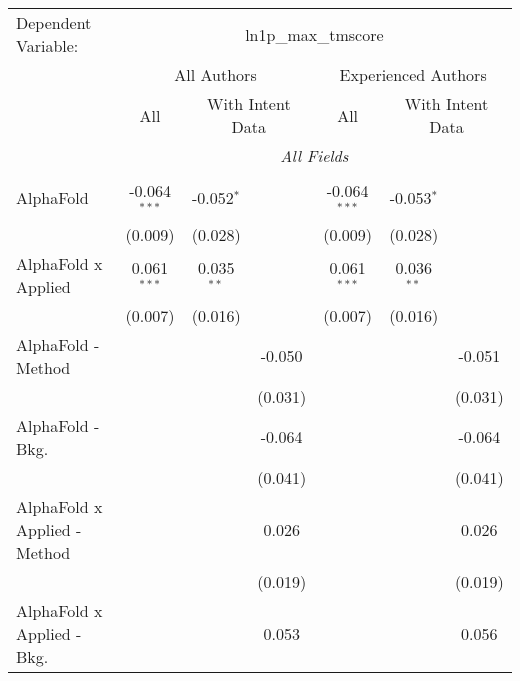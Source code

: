 \begingroup
\centering
\begin{tabular}{lcccccc}
   \tabularnewline \midrule \midrule
   Dependent Variable: & \multicolumn{6}{c}{ln1p\_max\_tmscore}\\
 & \multicolumn{3}{c}{All Authors} & \multicolumn{3}{c}{Experienced Authors} \\
\cmidrule(lr){2-4} \cmidrule(lr){5-7}
 & \multicolumn{1}{c}{All} & \multicolumn{2}{c}{With Intent Data} & \multicolumn{1}{c}{All} & \multicolumn{2}{c}{With Intent Data} \\
\cmidrule(lr){2-2} \cmidrule(lr){3-4} \cmidrule(lr){5-5} \cmidrule(lr){6-7}
 & \multicolumn{6}{c}{\textit{All Fields}} \\ \\
   AlphaFold                      & -0.064$^{***}$ & -0.052$^{*}$ &                & -0.064$^{***}$ & -0.053$^{*}$ &   \\   
                                  & (0.009)        & (0.028)      &                & (0.009)        & (0.028)      &   \\   
   AlphaFold x Applied            & 0.061$^{***}$  & 0.035$^{**}$ &                & 0.061$^{***}$  & 0.036$^{**}$ &   \\   
                                  & (0.007)        & (0.016)      &                & (0.007)        & (0.016)      &   \\   
   AlphaFold - Method             &                &              & -0.050         &                &              & -0.051\\   
                                  &                &              & (0.031)        &                &              & (0.031)\\   
   AlphaFold - Bkg.               &                &              & -0.064         &                &              & -0.064\\   
                                  &                &              & (0.041)        &                &              & (0.041)\\   
   AlphaFold x Applied - Method   &                &              & 0.026          &                &              & 0.026\\   
                                  &                &              & (0.019)        &                &              & (0.019)\\   
   AlphaFold x Applied - Bkg.     &                &              & 0.053          &                &              & 0.056\\   

\end{tabular}
